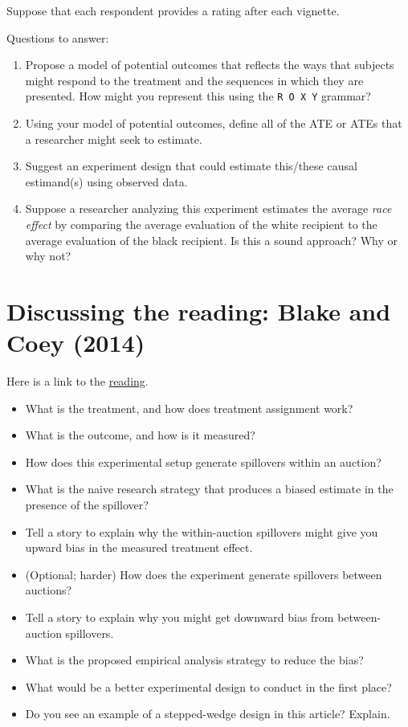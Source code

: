 \documentclass[
]{book}
\providecommand{\tightlist}{%
  \setlength{\itemsep}{0pt}\setlength{\parskip}{0pt}}
\begin{document}
Suppose that each respondent provides a rating after each vignette.

Questions to answer:

\begin{enumerate}
\def\labelenumi{\arabic{enumi}.}
\tightlist
\item
  Propose a model of potential outcomes that reflects the ways that
  subjects might respond to the treatment and the sequences in which
  they are presented. How might you represent this using the
  \texttt{R\ O\ X\ Y} grammar?
\item
  Using your model of potential outcomes, define all of the ATE or ATEs
  that a researcher might seek to estimate.
\item
  Suggest an experiment design that could estimate this/these causal
  estimand(s) using observed data.
\item
  Suppose a researcher analyzing this experiment estimates the average
  \emph{race effect} by comparing the average evaluation of the white
  recipient to the average evaluation of the black recipient. Is this a
  sound approach? Why or why not?
\end{enumerate}

\hypertarget{discussing-the-reading-blake-and-coey-2014}{%
\section{Discussing the reading: Blake and Coey
(2014)}\label{discussing-the-reading-blake-and-coey-2014}}

Here is a link to the
\href{https://github.com/UC-Berkeley-I-School/mids-w241/blob/main/readings/Blake.2014.pdf}{reading}.

\begin{itemize}
\item
  What is the treatment, and how does treatment assignment work?
\item
  What is the outcome, and how is it measured?
\item
  How does this experimental setup generate spillovers within an
  auction?
\item
  What is the naive research strategy that produces a biased estimate in
  the presence of the spillover?
\item
  Tell a story to explain why the within-auction spillovers might give
  you upward bias in the measured treatment effect.
\item
  (Optional; harder) How does the experiment generate spillovers between
  auctions?
\item
  Tell a story to explain why you might get downward bias from
  between-auction spillovers.
\item
  What is the proposed empirical analysis strategy to reduce the bias?
\item
  What would be a better experimental design to conduct in the first
  place?
\item
  Do you see an example of a stepped-wedge design in this article?
  Explain.
\end{itemize}
\end{document}
